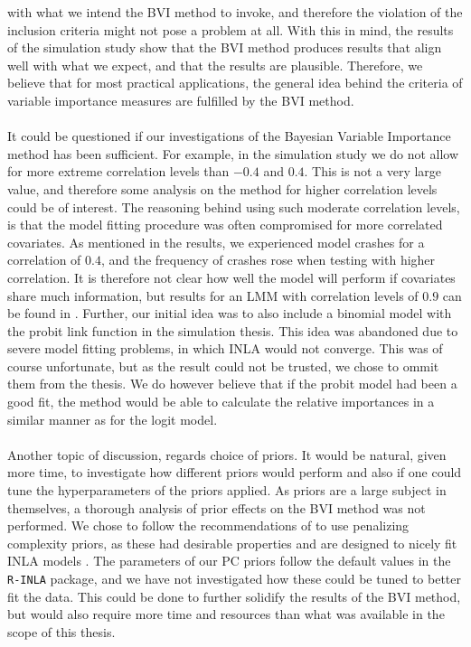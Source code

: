 with what we intend the BVI method to invoke, and therefore the violation of the inclusion criteria might not pose a problem at all. With this in mind, the results of the simulation study show that the BVI method produces results that align well with what we expect, and that the results are plausible. Therefore, we believe that for most practical applications, the general idea behind the criteria of variable importance measures are fulfilled by the BVI method. 
\\
\\
It could be questioned if our investigations of the Bayesian Variable Importance method has been sufficient. For example, in the simulation study we do not allow for more extreme correlation levels than $-0.4$ and $0.4$. This is not a very large value, and therefore some analysis on the method for higher correlation levels could be of interest. The reasoning behind using such moderate correlation levels, is that the model fitting procedure was often compromised for more correlated covariates. As mentioned in the results, we experienced model crashes for a correlation of $0.4$, and the frequency of crashes rose when testing with higher correlation. It is therefore not clear how well the model will perform if covariates share much information, but results for an LMM with correlation levels of $0.9$ can be found in \citet{Arnstad:Relative_variable_importance_in_Bayesian_linear_mixed_models:2024}. Further, our initial idea was to also include a binomial model with the probit link function in the simulation thesis. This idea was abandoned due to severe model fitting problems, in which INLA would not converge. This was of course unfortunate, but as the result could not be trusted, we chose to ommit them from the thesis. We do however believe that if the probit model had been a good fit, the method would be able to calculate the relative importances in a similar manner as for the logit model.
\\
\\
Another topic of discussion, regards choice of priors. It would be natural, given more time, to investigate how different priors would perform and also if one could tune the hyperparameters of the priors applied. As priors are a large subject in themselves, a thorough analysis of prior effects on the BVI method was not performed. We chose to follow the recommendations of \citet{simpson2017penalising} to use penalizing complexity priors, as these had desirable properties and are designed to nicely fit INLA models \citep{simpson2017penalising}. The parameters of our PC priors follow the default values in the \texttt{R-INLA} package, and we have not investigated how these could be tuned to better fit the data. This could be done to further solidify the results of the BVI method, but would also require more time and resources than what was available in the scope of this thesis. 

